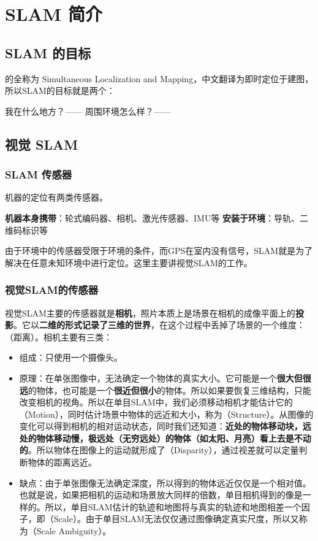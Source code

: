 \chapter{SLAM 简介}
\section{SLAM 的目标}
\thispagestyle{empty}
 的全称为 Simultaneous Localization and Mapping，中文翻译为即时定位于建图，所以SLAM的目标就是两个：

\noa[1] 我在什么地方？——
\noa[2] 周围环境怎么样？——

\section{视觉 SLAM}
\subsection{SLAM 传感器}
机器的定位有两类传感器。

\noa[1] \textbf{机器本身携带}：轮式编码器、相机、激光传感器、IMU等
\noa[2] \textbf{安装于环境}：导轨、二维码标识等

由于环境中的传感器受限于环境的条件，而GPS在室内没有信号，SLAM就是为了解决在任意未知环境中进行定位。这里主要讲视觉SLAM的工作。

\subsection{视觉SLAM的传感器}

视觉SLAM主要的传感器就是\textbf{相机}，照片本质上是场景在相机的成像平面上的\textbf{投影}。它以\textbf{二维的形式记录了三维的世界}，在这个过程中丢掉了场景的一个维度：（距离）。相机主要有三类：

\nob[1] 
\begin{itemize}[itemsep=0.1pt,topsep =2pt]
    \item 组成：只使用一个摄像头。
    \item 原理：在单张图像中，无法确定一个物体的真实大小。它可能是一个\textbf{很大但很远}的物体，也可能是一个\textbf{很近但很小}的物体。所以如果要恢复三维结构，只能改变相机的视角。所以在单目SLAM中，我们必须移动相机才能估计它的（Motion），同时估计场景中物体的远近和大小，称为（Structure）。从图像的变化可以得到相机的相对运动状态，同时我们还知道：\textbf{近处的物体移动块，远处的物体移动慢，极远处（无穷远处）的物体（如太阳、月亮）看上去是不动的}。所以物体在图像上的运动就形成了（Disparity），通过视差就可以定量判断物体的距离远近。
    \item 缺点：由于单张图像无法确定深度，所以得到的物体远近仅仅是一个相对值。也就是说，如果把相机的运动和场景放大同样的倍数，单目相机得到的像是一样的。所以，单目SLAM估计的轨迹和地图将与真实的轨迹和地图相差一个因子，即（Scale）。由于单目SLAM无法仅仅通过图像确定真实尺度，所以又称为（Scale Ambiguity）。
\end{itemize}
\vspace*{0.5em}

